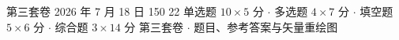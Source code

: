 \documentclass[11pt,a4paper,fontset=none]{ctexart}
\begin{document}
\raggedbottom

\makecover
  {第三套卷}
  {2026 年 7 月 18 日}
  {150}
  {22}
  {单选题 \(10\times5\) 分 \(\cdot\)
   多选题 \(4\times7\) 分 \(\cdot\)
   填空题 \(5\times6\) 分 \(\cdot\)
   综合题 \(3\times14\) 分}
  {第三套卷 \(\cdot\) 题目、参考答案与矢量重绘图}



\solutiondivider

\end{document}
